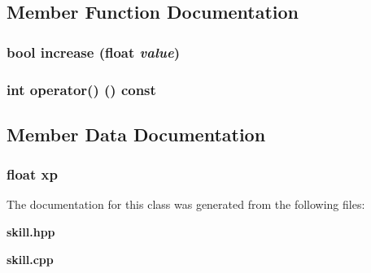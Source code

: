 \subsection{Member Function Documentation}
\subsubsection{\setlength{\rightskip}{0pt plus 5cm}bool increase (float {\em value})}\label{classSkill_a4}


\subsubsection{\setlength{\rightskip}{0pt plus 5cm}int operator() () const}\label{classSkill_a3}




\subsection{Member Data Documentation}
\subsubsection{\setlength{\rightskip}{0pt plus 5cm}float {\bf xp}}\label{classSkill_o0}




The documentation for this class was generated from the following files:\begin{CompactItemize}
\item 
{\bf skill.hpp}\item 
{\bf skill.cpp}\end{CompactItemize}
